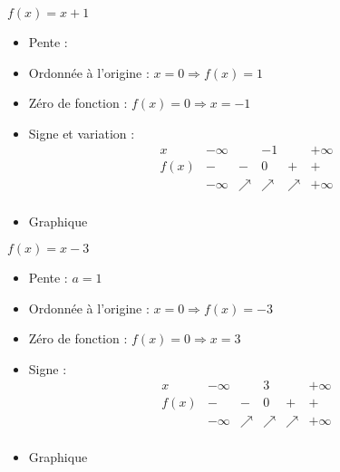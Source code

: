 \begin{solution}
$f(x)=x+1$
\begin{itemize}
\item Pente :	 
\item Ordonnée à l’origine :	$x=0\Rightarrow f(x)=1$ 
\item Zéro de fonction :	$f(x)=0\Rightarrow x=-1$
\item Signe et variation :	
$$\begin{array}{l|l|l|l|l|l}
x    & -\infty &   & -1 &   & +\infty \\
\hline
f(x) & -       & - & 0  & + & +   \\
 & -\infty & \nearrow & \nearrow & \nearrow & +\infty \\   
\end{array}$$
\item Graphique
\end{itemize}
\end{solution}

\begin{solution}
$f(x)=x-3$
\begin{itemize}
\item Pente :	$a=1$
\item Ordonnée à l’origine :	$x=0\Rightarrow f(x)=-3$
\item Zéro de fonction :	$f(x)=0\Rightarrow x=3$
\item Signe :	
$$\begin{array}{l|l|l|l|l|l}
x    & -\infty &   & 3 &   & +\infty \\
\hline
f(x) & -       & - & 0  & + & +      \\
& -\infty & \nearrow & \nearrow & \nearrow & +\infty \\   
\end{array}$$
\item Graphique
\end{itemize}
\end{solution}

